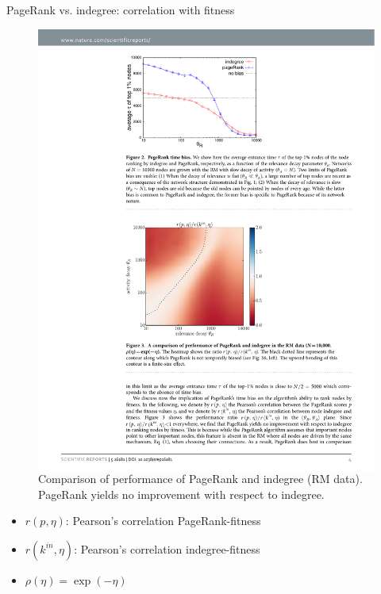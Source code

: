 \documentclass[utf8]{beamer}
\begin{document}
\begin{frame}{PageRank vs. indegree: correlation with fitness}
    \begin{figure}
        \begin{columns}

            \includegraphics[width=1.0\textwidth]{figures/PageRankRM_heatmap}

            \caption{Comparison of performance of PageRank and indegree (RM data). \newline
            PageRank yields no improvement with respect to indegree.}
        \end{columns}
    \end{figure}
    \begin{itemize}
        \item $r(p, \eta)$: Pearson's correlation PageRank-fitness
        \item $r(k^{in}, \eta)$: Pearson's correlation indegree-fitness
        \item $\rho(\eta) = \exp(-\eta)$
    \end{itemize}
\end{frame}
\end{document}
